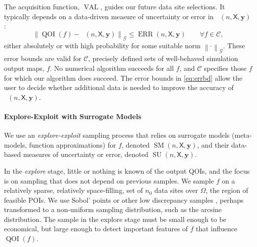 \documentclass[11pt]{NSFamsart}
\DeclareMathOperator{\QOI}{QOI} %
\DeclareMathOperator{\APP}{\widehat{\QOI}}
\DeclareMathOperator{\SURR}{SM} %
\DeclareMathOperator{\ERR}{ERR}
\DeclareMathOperator{\VAL}{VAL}
\DeclareMathOperator{\SURRERR}{SU}
\newcommand{\mX}{\mathsf{X}}
\newcommand{\by}{{\boldsymbol{y}}}
\newcommand{\calc}{{\mathcal{C}}}
\newcommand{\calg}{{\mathcal{G}}}
\newcommand{\norm}[2][{}]{\ensuremath{\left \lVert #2 \right \rVert}_{#1}}
\newcommand{\bignorm}[2][{}]{\ensuremath{\bigl \lVert #2 \bigr \rVert}_{#1}}
\begin{document}
The acquisition function, $\VAL$, guides our future data site selections.  It typically depends on a data-driven measure of uncertainty or error in $\APP(n,\mX,\by)$: 
\begin{equation} \label{eq:errbd}
    \bignorm[\calg]{\QOI(f) - \APP(n,\mX,\by)} \le \ERR(n,\mX,\by) \qquad \forall f \in \calc,
\end{equation}
either absolutely or with high probability for some suitable norm $\norm[\calg]{\cdot}$.  These error bounds are valid for $\calc$,  precisely defined sets of well-behaved simulation output maps, $f$.  No numerical algorithm succeeds for all $f$, and $\calc$ specifies those $f$ for which our algorithm does succeed. The error bounds in \eqref{eq:errbd} allow the user to decide whether additional data is needed to improve the accuracy of $\APP(n,\mX,\by)$.





\paragraph*{Explore-Exploit with Surrogate Models} We use an \emph{explore-exploit} sampling process that relies on surrogate models (meta-models, function approximations) for $f$, denoted $\SURR(n,\mX,\by)$, and their data-based measures of uncertainty or error, denoted $\SURRERR(n,\mX,\by)$.  

In the \emph{explore} stage, little or nothing is known of the output QOIs, and the focus is on sampling that does not depend on previous samples.  We sample $f$ on a relatively sparse, relatively space-filling, set of $n_0$ data sites over $\Omega$, the region of feasible POIs.  We use  Sobol' points or other low discrepancy samples \cite{DicPil10a}, perhaps transformed to a non-uniform sampling distribution, such as the arcsine distribution. The sample in the explore stage must be small enough to be economical, but large enough to detect important features of $f$ that influence $\QOI(f)$.
\end{document}
